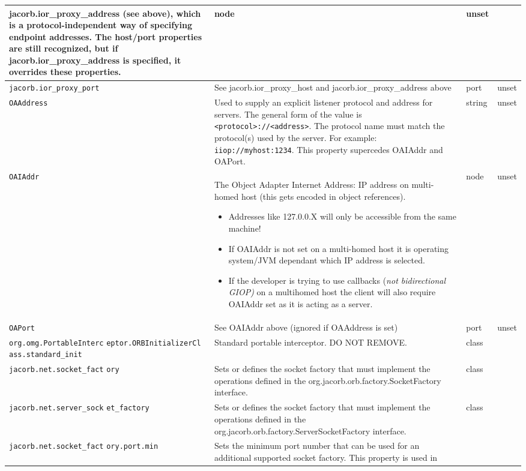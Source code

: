 {{\begin{small}
\begin{longtable}{|p{5cm}|p{7.5cm}|p{1.5cm}|p{1.5cm}|}
jacorb.ior\_proxy\_address (see above), which is a
protocol-independent way of specifying endpoint addresses.  The
host/port properties are still recognized, but if
jacorb.ior\_proxy\_address is specified, it overrides these properties.
& node & unset \\
\hline
\verb"jacorb.ior_proxy_port" & See jacorb.ior\_proxy\_host and
jacorb.ior\_proxy\_address above &
port & unset \\
\hline
\verb"OAAddress" & Used to supply an explicit listener protocol and
address for servers. The general form of the value is
{\tt <protocol>://<address>}. The protocol name must match the
protocol(s) used by the server. For example: {\tt
  iiop://myhost:1234}. This property supercedes OAIAddr and OAPort.
& string & unset \\
\hline
\verb"OAIAddr" & The Object Adapter Internet Address: IP address on
multi-homed host (this gets encoded in object references).
\begin{itemize}
\item Addresses like 127.0.0.X will only be accessible from the same
machine!
\item If OAIAddr is not set on a multi-homed host it is operating system/JVM
dependant which IP address is selected.
\item If the developer is trying to use callbacks (\textit{not\textit{ bidirectional
GIOP)}} on a multihomed host the client
will also require OAIAddr set as it is acting as a server.
\end{itemize}
  & node & unset \\
\hline
\verb"OAPort" & See OAIAddr above (ignored if OAAddress is set) & port & unset \\
\hline
\verb"org.omg.PortableInterc"
\verb"eptor.ORBInitializerCl"
\verb"ass.standard_init" & Standard portable interceptor. DO NOT
REMOVE. & class &  \\
\hline
\verb"jacorb.net.socket_fact"
\verb"ory" & Sets or defines the socket factory that must implement
the operations defined in the org.jacorb.orb.factory.SocketFactory
interface. & class & \\
\hline
\verb"jacorb.net.server_sock"
\verb"et_factory" & Sets or defines the socket factory that must
implement the operations defined in the
org.jacorb.orb.factory.ServerSocketFactory interface. & class & \\
\hline
\verb"jacorb.net.socket_fact"
\verb"ory.port.min" & Sets the minimum port number that can be used
for an additional supported socket factory. This property is used in

\end{longtable}
\end{small}}}
